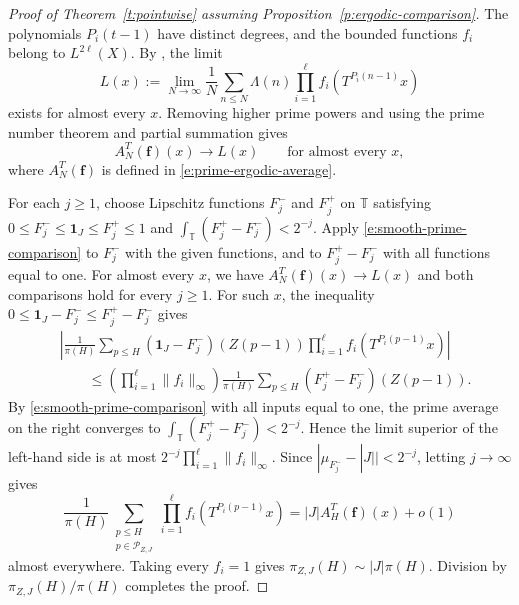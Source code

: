 \documentclass[12pt]{amsart}
\newcommand{\1}{\mathbf 1}
\theoremstyle{definition}
\begin{document}
\begin{proof}[Proof of Theorem~\ref{t:pointwise} assuming
Proposition~\ref{p:ergodic-comparison}]
The polynomials \(P_i(t-1)\) have distinct degrees, and the
bounded functions \(f_i\) belong to \(L^{2\ell}(X)\). By
\cite[Theorem~1.1(ii)]{MirekWanWright}, the limit
\[
 L(x):=\lim_{N\to\infty}
 \frac1N\sum_{n\leq N}\Lambda(n)
 \prod_{i=1}^{\ell} f_i(T^{P_i(n-1)}x)
\]
exists for almost every \(x\). Removing higher prime powers and
using the prime number theorem and partial summation gives
\[
 A_N^T(\mathbf f)(x)\longrightarrow L(x)
 \qquad\text{for almost every }x,
\]
where \(A_N^T(\mathbf f)\) is defined in
\eqref{e:prime-ergodic-average}.

For each \(j\ge1\), choose Lipschitz functions \(F_j^-\) and \(F_j^+\)
on \(\mathbb T\) satisfying \(0\le F_j^-\le\mathbf1_J\le F_j^+\le1\)
and \(\int_{\mathbb T}(F_j^+-F_j^-)<2^{-j}\). Apply
\eqref{e:smooth-prime-comparison} to \(F_j^-\) with the given
functions, and to \(F_j^+-F_j^-\) with all functions equal to one.
For almost every $x$, we have $A_N^T(\mathbf f)(x)\to L(x)$
and both comparisons hold for every $j\geq1$. For such $x$,
the inequality $0\leq\mathbf1_J-F_j^-\leq F_j^+-F_j^-$ gives
\[
\begin{aligned}
 &\left|\frac1{\pi(H)}\sum_{p\leq H}
   (\mathbf1_J-F_j^-)(Z(p-1))
   \prod_{i=1}^{\ell}f_i(T^{P_i(p-1)}x)\right|\\
 &\qquad\leq
 \left(\prod_{i=1}^{\ell}\|f_i\|_\infty\right)
 \frac1{\pi(H)}\sum_{p\leq H}(F_j^+-F_j^-)(Z(p-1)).
\end{aligned}
\]
By \eqref{e:smooth-prime-comparison} with all inputs equal to one,
the prime average on the right converges to
\(\int_{\mathbb T}(F_j^+-F_j^-)<2^{-j}\). Hence the limit superior
of the left-hand side is at most
\(2^{-j}\prod_{i=1}^{\ell}\|f_i\|_\infty\).
Since \(|\mu_{F_j^-}-|J||<2^{-j}\), letting \(j\to\infty\) gives
\[
 \frac1{\pi(H)}
 \sum_{\substack{p\le H\\p\in\mathcal P_{Z,J}}}
       \prod_{i=1}^{\ell} f_i(T^{P_i(p-1)}x)
 =|J| A_H^T(\mathbf f)(x)+o(1)
\]
almost everywhere. Taking every \(f_i=1\) gives
\(\pi_{Z,J}(H)\sim |J|\pi(H)\). Division by
\(\pi_{Z,J}(H)/\pi(H)\) completes the proof.
\end{proof}
\end{document}
